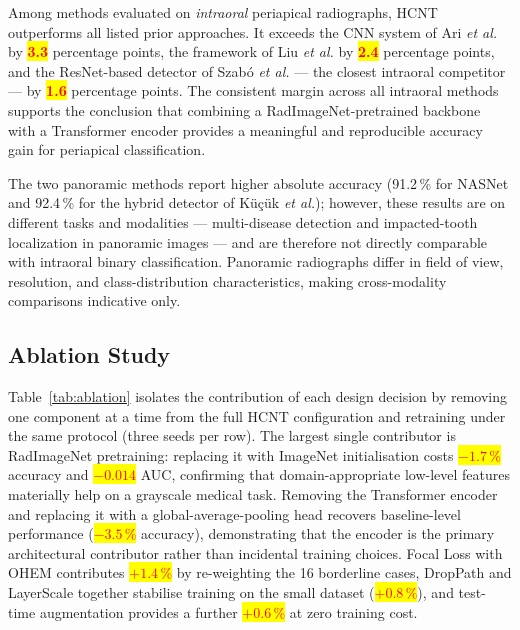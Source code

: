 \documentclass[conference]{IEEEtran}
\newcommand{\HCNT}{\textsc{HCNT}\xspace}
\newcommand{\etal}{\textit{et al.}\xspace}
\newcommand{\RESULT}[1]{\colorbox{yellow}{\textcolor{red}{\textbf{#1}}}}
\begin{document}
Among methods evaluated on \emph{intraoral} periapical radiographs, \HCNT
outperforms all listed prior approaches. It exceeds the CNN system of Ari
\etal \cite{ari2022} by \RESULT{3.3} percentage points, the framework of Liu \etal
\cite{liu2024} by \RESULT{2.4} percentage points, and the ResNet-based detector of
Szab\'{o} \etal \cite{szabo2025} --- the closest intraoral competitor --- by
\RESULT{1.6} percentage points. The consistent margin across all intraoral methods
supports the conclusion that combining a RadImageNet-pretrained backbone
with a Transformer encoder provides a meaningful and reproducible accuracy
gain for periapical classification.

The two panoramic methods report higher absolute accuracy (91.2\,\% for
NASNet \cite{alghamdi2022} and 92.4\,\% for the hybrid detector of
K\"{u}\c{c}\"{u}k \etal \cite{kucuketal2025}); however, these results are on
different tasks and modalities --- multi-disease detection and impacted-tooth
localization in panoramic images --- and are therefore not directly
comparable with intraoral binary classification. Panoramic radiographs
differ in field of view, resolution, and class-distribution characteristics,
making cross-modality comparisons indicative only.

\subsection{Ablation Study}

Table~\ref{tab:ablation} isolates the contribution of each design decision
by removing one component at a time from the full \HCNT configuration and
retraining under the same protocol (three seeds per row).
The largest single contributor is RadImageNet pretraining: replacing it with
ImageNet initialisation costs \RESULT{$-1.7\,\%$} accuracy and \RESULT{$-0.014$} AUC,
confirming that domain-appropriate low-level features materially help on a
grayscale medical task. Removing the Transformer encoder and replacing it
with a global-average-pooling head recovers baseline-level performance
(\RESULT{$-3.5\,\%$} accuracy), demonstrating that the encoder is the primary
architectural contributor rather than incidental training choices. Focal
Loss with OHEM contributes \RESULT{$+1.4\,\%$} by re-weighting the 16 borderline
cases, DropPath and LayerScale together stabilise training on the small
dataset (\RESULT{$+0.8\,\%$}), and test-time augmentation provides a further
\RESULT{$+0.6\,\%$} at zero training cost.
\end{document}
